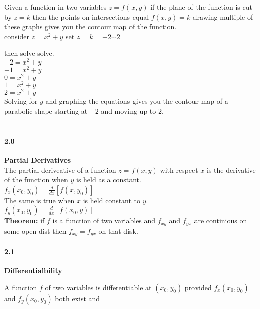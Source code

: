 \documentclass[14pt]{extreport}
\begin{document}
Given a function in two variables $z=f(x, y)$ if the plane of the function is cut by $z=k$ then the points on intersections equal $f(x,y)=k$ drawing multiple of these graphs gives you the contour map of the function.\\

consider $z=x^2 + y$ set $z=k = -2\cdots 2$

then solve solve.\\

$-2 = x^2 +y$\\
$-1 = x^2 +y$\\
$0 = x^2 +y$\\
$1 = x^2 +y$\\
$2 = x^2 +y$\\

Solving for $y$ and graphing the equations gives you the contour map of a parabolic shape starting at $-2$ and moving up to $2$.\\\\

\paragraph{2.0}\textbf{Partial Derivatives}\\

The partial deriveative of a function $z = f(x,y)$ with respect $x$ is the derivative of the function when $y$ is held as a constant.\\

$f_x(x_0,y_0) = \frac{d}{dx}[f(x, y_0)]$\\


The same is true when $x$ is held constant to $y$.\\

$f_y(x_0,y_0) = \frac{d}{dx}[f(x_0, y)]$\\

\textbf{Theorem:} if $f$ is a function of two variables and $f_{xy}$ and $f_{yx}$ are continious on some open dist then $f_{xy}=f_{yx}$ on that disk.\\

\paragraph{2.1}\textbf{Differentialbility}

A function $f$ of two variables is differentiable at $(x_0, y_0)$ provided $f_x(x_0, y_0)$ and $f_y(x_0, y_0)$ both exist and \\
\end{document}
